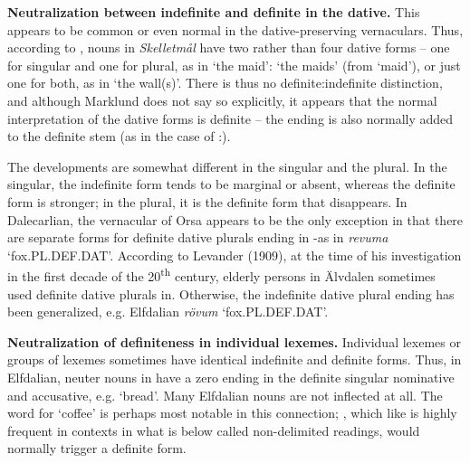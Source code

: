 
\textbf{Neutralization between indefinite and definite in the dative.} This appears to be common or even normal in the dative-preserving vernaculars. Thus, according to \citet{Marklund1976}, nouns in \textit{Skelletmål} have two rather than four dative forms – one for singular and one for plural, as in  ‘the maid’:  ‘the maids’ (from  ‘maid’), or just one for both, as in ‘the wall(s)’. There is thus no definite:indefinite distinction, and although Marklund does not say so explicitly, it appears that the normal interpretation of the dative forms is definite – the ending is also normally added to the definite stem (as in the case of :).


The developments are somewhat different in the singular and the plural. In the singular, the indefinite form tends to be marginal or absent, whereas the definite form is stronger; in the plural, it is the definite form that disappears. In Dalecarlian,  the vernacular of Orsa appears to be the only exception in that there are separate forms for definite dative plurals ending in \nobreakdash-as in \textit{revuma} ‘fox.PL.DEF.DAT’. According to Levander\textsc{ (1909)}, at the time of his investigation in the first decade of the 20\textsuperscript{th} century, elderly persons in Älvdalen sometimes used definite dative plurals in\textstyleLinguisticExample{ }.  Otherwise, the indefinite dative plural ending  has been generalized, e.g. Elfdalian \textit{rövum} ‘fox.PL.DEF.DAT’.


\textbf{Neutralization of definiteness in individual lexemes. }Individual lexemes or groups of lexemes sometimes have identical indefinite and definite forms. Thus, in Elfdalian, neuter nouns in have a zero ending in the definite singular nominative and accusative, e.g.  ‘bread’. Many Elfdalian nouns are not inflected at all.  The word for ‘coffee’ is perhaps most notable in this connection; , which like  is highly frequent in contexts in what is below called non-delimited readings, would normally trigger a definite form. 

